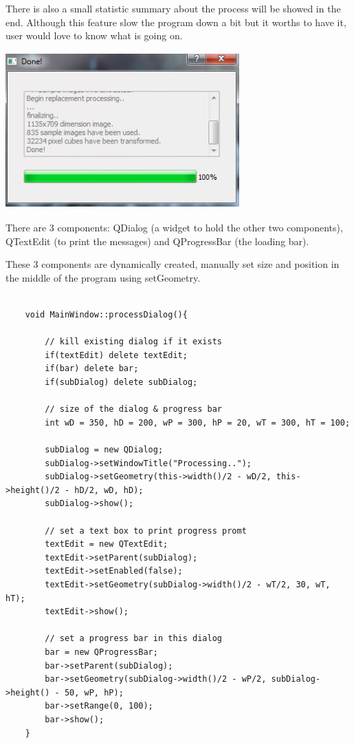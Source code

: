 \documentclass[english]{article}
\begin{document}
{There is also a small statistic summary about the process will be showed in the end. Although this feature slow the program down a bit but it worths to have it, user would love to know what is going on. 

\begin{center}
	\includegraphics[width=9cm,height=6cm]{img/dialog.jpg}	
\end{center}  

\lstset{language=C++}

There are 3 components: QDialog (a widget to hold the other two components), QTextEdit (to print the messages) and QProgressBar (the loading bar).\newline

These 3 components are dynamically created, manually set size and position in the middle of the program using setGeometry. 

\begin{lstlisting}

	void MainWindow::processDialog(){
		
		// kill existing dialog if it exists
		if(textEdit) delete textEdit;
		if(bar) delete bar;
		if(subDialog) delete subDialog;
		
		// size of the dialog & progress bar
		int wD = 350, hD = 200, wP = 300, hP = 20, wT = 300, hT = 100;
		
		subDialog = new QDialog;
		subDialog->setWindowTitle("Processing..");
		subDialog->setGeometry(this->width()/2 - wD/2, this->height()/2 - hD/2, wD, hD);
		subDialog->show();
		
		// set a text box to print progress promt
		textEdit = new QTextEdit;
		textEdit->setParent(subDialog);
		textEdit->setEnabled(false);
		textEdit->setGeometry(subDialog->width()/2 - wT/2, 30, wT, hT);
		textEdit->show();
		
		// set a progress bar in this dialog
		bar = new QProgressBar;
		bar->setParent(subDialog);
		bar->setGeometry(subDialog->width()/2 - wP/2, subDialog->height() - 50, wP, hP);
		bar->setRange(0, 100);
		bar->show();
	}
	

\end{lstlisting}}
\end{document}

